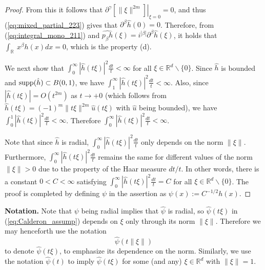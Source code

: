 \documentclass[11pt]{article}
\theoremstyle{remark}
\theoremstyle{example}
\theoremstyle{remark}
\newcommand{\R}{\mathbb{R}}
\newcommand{\blue}{\textcolor{blue}}
\begin{document}
\begin{proof}
\begin{comment}
\frac{ (2\alpha_i)! }{ (2 \alpha_i - \gamma_i )! }  \xi_i^{ 2 \alpha_i - \gamma_i }, \quad {\rm if}\ 2 \alpha_i \geq \gamma_i \\
0, \quad \quad {\rm otherwise}
\end{cases}.
\]
Also note that, since $| \alpha | = m$ and $|\gamma| \leq |\beta| \leq s < 2m$, we have $|\gamma| < 2 | \alpha |$.
This implies that there exists at least one index $\ell \in \{ 1,\dots, d \}$ such that $2 \alpha_\ell > \gamma_\ell$.
For this $\ell$ we then have 
\blue{$\left. \frac{d^{ \gamma_\ell }}{d \xi_\ell^{\gamma_\ell}} \left[ \xi_\ell^{2 \alpha_\ell} \right] \right|_{\xi = 0} = \left. \frac{ (2\alpha_\ell)! }{ (2 \alpha_\ell - \gamma_\ell )! }  \xi_\ell^{ 2 \alpha_\ell - \gamma_\ell } \right|_{\xi = 0} = 0$}.  
\end{comment}
From this it follows that
$\left. \partial^\gamma \left[\| \xi \|^{2m} \right] \right|_{\xi = 0} = 0$,
and thus (\ref{eq:mixed_partial_223}) gives that
$\partial^{ \beta } \hat{h} (0) = 0$.
Therefore, from (\ref{eq:integral_mono_211}) and $\widehat{p_\beta h}(\xi) = i^{| \beta |} \partial^{ \beta } \hat{h} (\xi)$, it holds that
$\int_\R~ x^\beta h(x) dx  = 0$,
which is the property (d). 

We next show that $\int_0^\infty | \hat{h}(t \xi) |^2 \frac{dt}{t} < \infty$ for all $\xi \in \R^d \backslash \{0\}$.
Since $\hat{h}$ is bounded and ${\rm supp} (\hat{h}) \subset B(0,1)$, we have $\int_1^\infty | \hat{h}(t \xi) |^2 \frac{dt}{t} < \infty$.
Also, since $| \hat{h}(t\xi) | = O(t^{2m})$ as $t \to +0$ (which follows from $\hat{h}(t\xi) = (-1)^m \| t\xi \|^{2m} \hat{u}(t \xi)$ with $\hat{u}$ being bounded), we have $\int_0^1  | \hat{h}(t \xi) |^2 \frac{dt}{t} < \infty$.
Therefore $\int_0^\infty | \hat{h}(t \xi) |^2 \frac{dt}{t} < \infty$.

Note that since $\hat{h}$ is radial, $\int_0^\infty | \hat{h}(t \xi) |^2 \frac{dt}{t}$ only depends on the norm $\| \xi \|$. 
Furthermore, $\int_0^\infty | \hat{h}(t \xi) |^2 \frac{dt}{t}$ remains the same for different values of the norm $\| \xi \| > 0$ due to the property of the Haar measure $dt/t$.
In other words, there is a constant $0 < C < \infty$ satisfying $\int_0^\infty | \hat{h}(t \xi) |^2 \frac{dt}{t} = C$ for all $\xi \in \R^d \backslash \{0\}$. 
The proof is completed by defining $\psi$ in the assertion as $\psi(x) := C^{-1/2} h(x)$.%
\end{proof}

\noindent
\textbf{Notation.}
Note that $\psi$ being radial implies that $\hat{\psi}$ is radial, so $\hat{\psi}(t \xi)$ in (\ref{eq:Calderon_assump}) depends on $\xi$ only through its norm $\| \xi \|$.
Therefore we may henceforth use the notation 
\begin{equation} \label{eq:notation_psi_xi}
 \hat{\psi}(t \| \xi \|)
\end{equation}
to denote $\hat{\psi}(t \xi)$, to emphasize its dependence on the norm.
Similarly, we use the notation $\hat{\psi}(t)$ to imply $\hat{\psi}(t \xi)$ for some (and any) $\xi \in \R^d$ with $\| \xi \| = 1$. 
\end{document}
